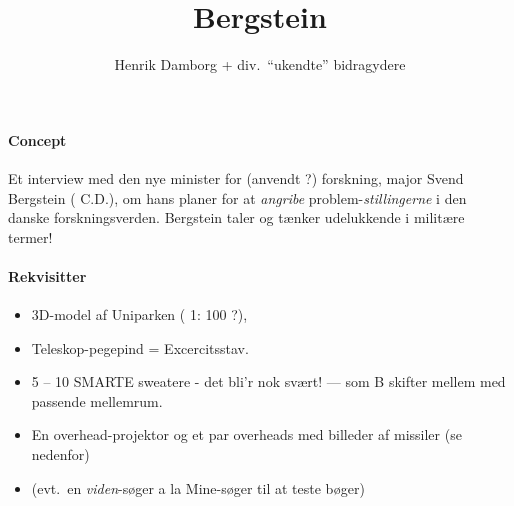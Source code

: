 \documentclass[a4paper,11pt]{article}
\title{Bergstein }
\author{Henrik Damborg + div.\ ``ukendte'' bidragydere}
\begin{document}
\maketitle

\paragraph{Concept} Et interview med den nye minister for (anvendt ?) 
forskning, major Svend Bergstein ( C.D.), om hans
planer for at {\em angribe}\/ problem-{\em stillingerne}\/ i den
danske forsk\-ningsverden. Bergstein taler og tænker
udelukkende i militære termer!

\begin{roles}
\end{roles}

\paragraph{   Rekvisitter}
\begin{itemize}
\item  3D-model af Uniparken ( 1: 100 ?),
\item             Teleskop-pegepind = Excercitsstav.
\item             5 -- 10 SMARTE sweatere - det bli'r nok svært! ---  som 
  B skifter mellem med passende mellemrum. 
\item             En overhead-projektor og et par overheads med billeder af 
  missiler (se nedenfor)

\item             (evt.\ en {\em viden}-søger a la Mine-søger til at teste bøger)
\end{itemize}
\end{document}
